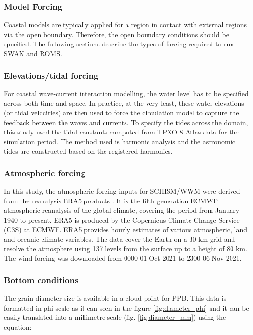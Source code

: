 \documentclass[12pt]{article}
\begin{document}
\subsubsection {Model Forcing}

Coastal models are typically applied for a region in contact with external regions via the open boundary. Therefore, the open boundary conditions should be specified. The following sections describe the types of forcing required to run SWAN and ROMS.

\subsubsection*{Elevations/tidal forcing}

For coastal wave-current interaction modelling, the water level has to be specified across both time and space. In practice, at the very least, these water elevations (or tidal velocities) are then used to force the circulation model to capture the feedback between the waves and currents. To specify the tides across the domain, this study used the tidal constants computed from TPXO 8 Atlas data \parencite{Egbert2002} for the simulation period. The method used is harmonic analysis and the astronomic tides are constructed based on the registered harmonics.  

\subsubsection*{Atmospheric forcing}

In this study, the atmospheric forcing inputs for SCHISM/WWM were derived from the reanalysis ERA5 products \parencite{Hersbach2019}. It is the fifth generation ECMWF atmospheric reanalysis of the global climate, covering the period from January 1940 to present. ERA5 is produced by the Copernicus Climate Change Service (C3S) at ECMWF. ERA5 provides hourly estimates of various atmospheric, land and oceanic climate variables. The data cover the Earth on a 30 km grid and resolve the atmosphere using 137 levels from the surface up to a height of 80 km. The wind forcing was downloaded from 0000 01-Oct-2021 to 2300 06-Nov-2021. 

\subsubsection*{Bottom conditions}

The grain diameter size is available in a cloud point for PPB. This data is formatted in phi scale as it can seen in the figure \ref{fig:diameter_phi} and it can be easily translated into a millimetre scale (fig. \ref{fig:diameter_mm}) using the equation:
\end{document}
